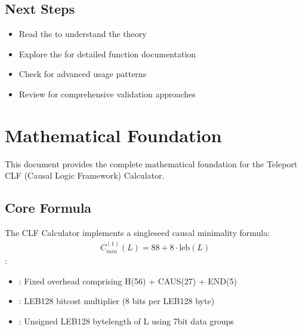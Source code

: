 \documentclass[letterpaper,10pt,english]{sphinxmanual}
\begin{document}
\subsection{Next Steps}
\label{\detokenize{quickstart:next-steps}}\begin{itemize}
\item {} 
\sphinxAtStartPar
Read the {\hyperref[\detokenize{mathematical_foundation::doc}]{}} to understand the theory

\item {} 
\sphinxAtStartPar
Explore the {\hyperref[\detokenize{api_reference::doc}]{}} for detailed function documentation

\item {} 
\sphinxAtStartPar
Check {\hyperref[\detokenize{examples::doc}]{}} for advanced usage patterns

\item {} 
\sphinxAtStartPar
Review {\hyperref[\detokenize{testing::doc}]{}} for comprehensive validation approaches

\end{itemize}

\sphinxstepscope


\section{Mathematical Foundation}
\label{\detokenize{mathematical_foundation:mathematical-foundation}}\label{\detokenize{mathematical_foundation::doc}}
\sphinxAtStartPar
This document provides the complete mathematical foundation for the Teleport CLF (Causal Logic Framework) Calculator.


\subsection{Core Formula}
\label{\detokenize{mathematical_foundation:core-formula}}
\sphinxAtStartPar
The CLF Calculator implements a single\sphinxhyphen{}seed causal minimality formula:
\begin{equation*}
\begin{split}C_{min}^{(1)}(L) = 88 + 8 \cdot \text{leb}(L)\end{split}
\end{equation*}
\sphinxAtStartPar
{}:
\begin{itemize}
\item {} 
\sphinxAtStartPar
{}: Fixed overhead comprising H(56) + CAUS(27) + END(5)

\item {} 
\sphinxAtStartPar
{}: LEB128 bit\sphinxhyphen{}cost multiplier (8 bits per LEB128 byte)

\item {} 
\sphinxAtStartPar
{}: Unsigned LEB128 byte\sphinxhyphen{}length of L using 7\sphinxhyphen{}bit data groups

\end{itemize}
\end{document}
